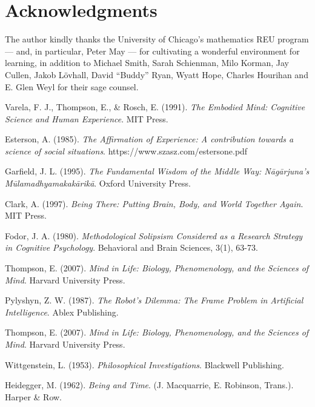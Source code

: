 \documentclass{article}
\begin{document}
\section*{Acknowledgments}

The author kindly thanks the University of Chicago's mathematics REU program --- and, in particular, Peter May --- for cultivating a wonderful environment for learning, in addition to Michael Smith, Sarah Schienman, Milo Korman, Jay Cullen, Jakob Lövhall, David ``Buddy'' Ryan, Wyatt Hope, Charles Hourihan and E. Glen Weyl for their sage counsel.

\begin{thebibliography}{9}

    Varela, F. J., Thompson, E., \& Rosch, E. (1991). \textit{The Embodied Mind: Cognitive Science and Human Experience}. MIT Press.

    Esterson, A. (1985). \textit{The Affirmation of Experience: A contribution towards a science of social situations}. https://www.szasz.com/estersone.pdf

    Garfield, J. L. (1995). \textit{The Fundamental Wisdom of the Middle Way: Nāgārjuna's Mūlamadhyamakakārikā}. Oxford University Press.

     Clark, A. (1997). \textit{Being There: Putting Brain, Body, and World Together Again}. MIT Press.

     Fodor, J. A. (1980). \textit{Methodological Solipsism Considered as a Research Strategy in Cognitive Psychology}. Behavioral and Brain Sciences, 3(1), 63-73.

     Thompson, E. (2007). \textit{Mind in Life: Biology, Phenomenology, and the Sciences of Mind}. Harvard University Press.

     Pylyshyn, Z. W. (1987). \textit{The Robot's Dilemma: The Frame Problem in Artificial Intelligence}. Ablex Publishing.

     Thompson, E. (2007). \textit{Mind in Life: Biology, Phenomenology, and the Sciences of Mind}. Harvard University Press.

     Wittgenstein, L. (1953). \textit{Philosophical Investigations}. Blackwell Publishing.

     Heidegger, M. (1962). \textit{Being and Time}. (J. Macquarrie, E. Robinson, Trans.). Harper \& Row.

\end{thebibliography}
\end{document}
